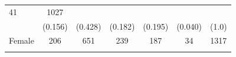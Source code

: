 \documentclass[11pt,a4paper,openany]{book}
\begin{document}
\begin{longtable}[]{@{}lcccccc@{}}
\begin{minipage}[t]{0.10\columnwidth}
41\strut
\end{minipage} & \begin{minipage}[t]{0.07\columnwidth}\centering\strut
1027\strut
\end{minipage}\tabularnewline
\begin{minipage}[t]{0.13\columnwidth}\raggedright\strut
\strut
\end{minipage} & \begin{minipage}[t]{0.15\columnwidth}\centering\strut
(0.156)\strut
\end{minipage} & \begin{minipage}[t]{0.09\columnwidth}\centering\strut
(0.428)\strut
\end{minipage} & \begin{minipage}[t]{0.15\columnwidth}\centering\strut
(0.182)\strut
\end{minipage} & \begin{minipage}[t]{0.10\columnwidth}\centering\strut
(0.195)\strut
\end{minipage} & \begin{minipage}[t]{0.10\columnwidth}\centering\strut
(0.040)\strut
\end{minipage} & \begin{minipage}[t]{0.07\columnwidth}\centering\strut
(1.0)\strut
\end{minipage}\tabularnewline
\begin{minipage}[t]{0.13\columnwidth}\raggedright\strut
Female\strut
\end{minipage} & \begin{minipage}[t]{0.15\columnwidth}\centering\strut
206\strut
\end{minipage} & \begin{minipage}[t]{0.09\columnwidth}\centering\strut
651\strut
\end{minipage} & \begin{minipage}[t]{0.15\columnwidth}\centering\strut
239\strut
\end{minipage} & \begin{minipage}[t]{0.10\columnwidth}\centering\strut
187\strut
\end{minipage} & \begin{minipage}[t]{0.10\columnwidth}\centering\strut
34\strut
\end{minipage} & \begin{minipage}[t]{0.07\columnwidth}\centering\strut
1317\strut
\end{minipage}\tabularnewline
\begin{minipage}[t]{0.13\columnwidth}\raggedright\strut

\end{minipage}
\end{longtable}
\end{document}
